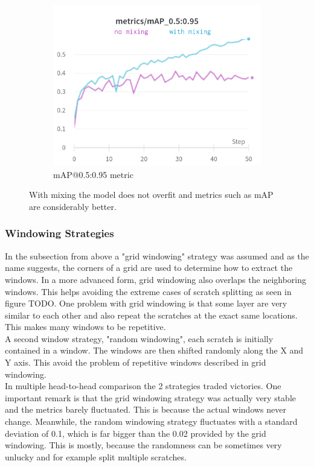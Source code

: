 \begin{figure}[!h]
\begin{subfigure}{0.33\textwidth}
  \centering
  \includegraphics[width=\linewidth]{images/implementation/windowing/mixing/mixing_big_map}
  \caption{mAP@0.5:0.95 metric}
\end{subfigure}
\caption{With mixing the model does not overfit and metrics such as mAP are considerably better.}
\label{impl:mixing}
\end{figure}


\subsubsection{Windowing Strategies}
In the subsection from above a "grid windowing" strategy was assumed and as the name suggests, the corners of a grid are used to determine how to extract the windows. In a more advanced form, grid windowing also overlaps the neighboring windows. This helps avoiding the extreme cases of scratch splitting as seen in figure TODO. One problem with grid windowing is that some layer are very similar to each other and also repeat the scratches at the exact same locations. This makes many windows to be repetitive.\\
A second window strategy, "random windowing", each scratch is initially contained in a window. The windows are then shifted randomly along the X and Y axis. This avoid the problem of repetitive windows described in grid windowing. \\
In multiple head-to-head comparison the 2 strategies traded victories. One important remark is that the grid windowing strategy was actually very stable and the metrics barely fluctuated. This is because the actual windows never change. Meanwhile, the random windowing strategy fluctuates with a standard deviation of 0.1, which is far bigger than the 0.02 provided by the grid windowing. This is mostly, because the randomness can be sometimes very unlucky and for example split multiple scratches. \\

